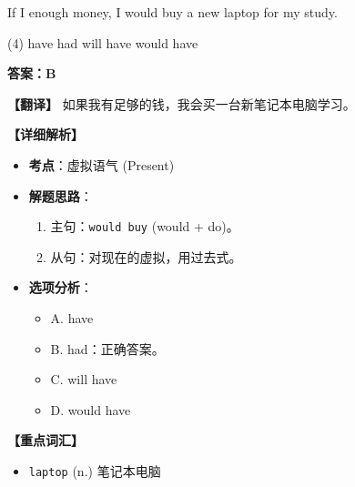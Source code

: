 \documentclass[11pt, a4paper]{article}
\newcommand{\analysis}[4]{
    \begin{solutionbox}
        \textbf{答案：#1}
        
        \textbf{【翻译】} #2
        
        \textbf{【详细解析】}
        #3
        
        \textbf{【重点词汇】}
        #4
    \end{solutionbox}
}
\newcommand{\blank}{\underline{\hspace{1.5cm}}}
\begin{document}
\begin{questions}
    \item If I \blank enough money, I would buy a new laptop for my study.
    \begin{tasks}(4)
        \task have \task had \task will have \task would have
    \end{tasks}
    \analysis{B}{如果我有足够的钱，我会买一台新笔记本电脑学习。}{
        \begin{itemize}
            \item \textbf{考点}：虚拟语气 (Present)
            \item \textbf{解题思路}：
                \begin{enumerate}
                    \item 主句：\texttt{would buy} (would + do)。
                    \item 从句：对现在的虚拟，用过去式。
                \end{enumerate}
            \item \textbf{选项分析}：
                \begin{itemize}
                    \item A. have
                    \item B. had：正确答案。
                    \item C. will have
                    \item D. would have
                \end{itemize}
        \end{itemize}
    }{
        \begin{itemize}
            \item \texttt{laptop} (n.) 笔记本电脑
        \end{itemize}
    }


\end{questions}
\end{document}
